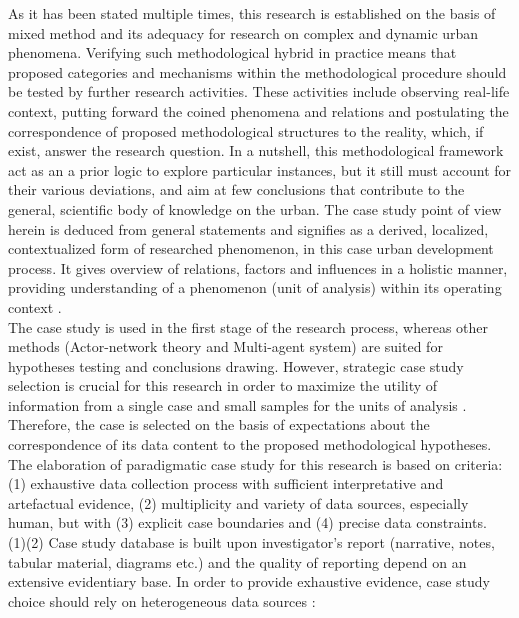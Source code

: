 \documentclass[11pt]{report}
\begin{document}
As it has been stated multiple times, this research is established on the basis of mixed method and its adequacy for research on complex and dynamic urban phenomena. Verifying such methodological hybrid in practice means that proposed categories and mechanisms within the methodological procedure should be tested by further research activities. These activities include observing real-life context, putting forward the coined phenomena and relations and postulating the correspondence of proposed methodological structures to the reality, which, if exist, answer the research question. In a nutshell, this methodological framework act as an a prior logic to explore particular instances, but it still must account for their various deviations, and aim at few conclusions that contribute to the general, scientific body of knowledge on the urban. The case study point of view herein is deduced from general statements and signifies as a derived, localized, contextualized form of researched phenomenon, in this case urban development process. It gives overview of relations, factors and influences in a holistic manner, providing understanding of a phenomenon (unit of analysis) within its operating context .
\\
The case study is used in the first stage of the research process, whereas other methods (Actor-network theory and Multi-agent system) are suited for hypotheses testing and conclusions drawing. However, strategic case study selection is crucial for this research in order to maximize the utility of information from a single case and small samples for the units of analysis . Therefore, the case is selected on the basis of expectations about the correspondence of its data content to the proposed methodological hypotheses. The elaboration of paradigmatic case study for this research is based on  criteria: (1) exhaustive data collection process with sufficient interpretative and artefactual evidence, (2) multiplicity and variety of data sources, especially human, but with (3) explicit case boundaries and (4) precise data constraints.
\\
(1)(2) Case study database is built upon investigator's report (narrative, notes, tabular material, diagrams etc.) and the quality of reporting depend on an extensive evidentiary base. In order to provide exhaustive evidence, case study choice should rely on heterogeneous data sources :
\end{document}
